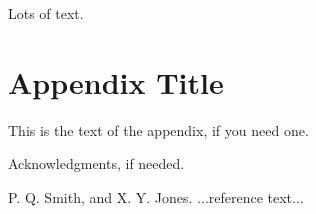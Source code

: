 \documentclass{sigplanconf}
\begin{document}
Lots of text.

\appendix
\section{Appendix Title}

This is the text of the appendix, if you need one.

\acks

Acknowledgments, if needed.





\begin{thebibliography}{}
\softraggedright

P. Q. Smith, and X. Y. Jones. ...reference text...

\end{thebibliography}
\end{document}
